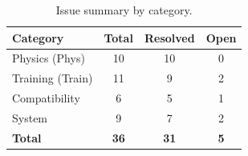 \documentclass[11pt]{article}
\begin{document}
\begin{table}[H]
  \centering
  \small
  \renewcommand{\arraystretch}{1.2}
  \caption{Issue summary by category.}
  \label{tab:issues-summary}
  \begin{tabular}{lccc}
    \toprule
    Category & Total & Resolved & Open \\
    \midrule
    Physics (Phys)     & 10 & 10 & 0 \\
    Training (Train)   & 11 &  9 & 2 \\
    Compatibility      &  6 &  5 & 1 \\
    System             &  9 &  7 & 2 \\
    \midrule
    \textbf{Total} & \textbf{36} & \textbf{31} & \textbf{5} \\
    \bottomrule
  \end{tabular}
\end{table}



\end{document}
